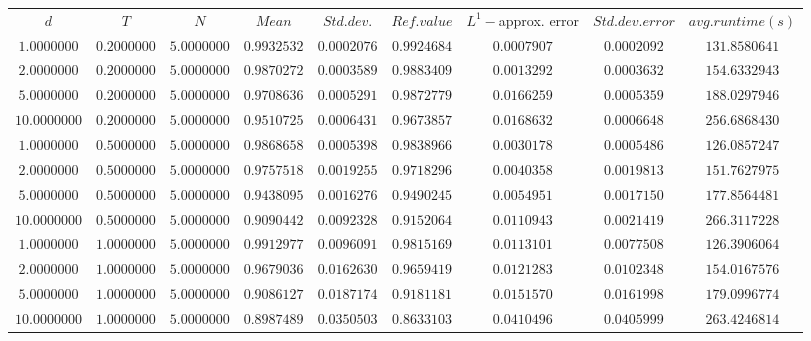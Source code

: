 \begin{tabular}{ccccccccc}
$d$ & $T$ & $N$ & $Mean$ & $Std. dev.$ & $Ref. value$ & $L^1-$approx. error & $Std. dev. error$ & $avg. runtime (s)$\\
$1.0000000$ & $0.2000000$ & $5.0000000$ & $0.9932532$ & $0.0002076$ & $0.9924684$ & $0.0007907$ & $0.0002092$ & $131.8580641$\\
$2.0000000$ & $0.2000000$ & $5.0000000$ & $0.9870272$ & $0.0003589$ & $0.9883409$ & $0.0013292$ & $0.0003632$ & $154.6332943$\\
$5.0000000$ & $0.2000000$ & $5.0000000$ & $0.9708636$ & $0.0005291$ & $0.9872779$ & $0.0166259$ & $0.0005359$ & $188.0297946$\\
$10.0000000$ & $0.2000000$ & $5.0000000$ & $0.9510725$ & $0.0006431$ & $0.9673857$ & $0.0168632$ & $0.0006648$ & $256.6868430$\\
$1.0000000$ & $0.5000000$ & $5.0000000$ & $0.9868658$ & $0.0005398$ & $0.9838966$ & $0.0030178$ & $0.0005486$ & $126.0857247$\\
$2.0000000$ & $0.5000000$ & $5.0000000$ & $0.9757518$ & $0.0019255$ & $0.9718296$ & $0.0040358$ & $0.0019813$ & $151.7627975$\\
$5.0000000$ & $0.5000000$ & $5.0000000$ & $0.9438095$ & $0.0016276$ & $0.9490245$ & $0.0054951$ & $0.0017150$ & $177.8564481$\\
$10.0000000$ & $0.5000000$ & $5.0000000$ & $0.9090442$ & $0.0092328$ & $0.9152064$ & $0.0110943$ & $0.0021419$ & $266.3117228$\\
$1.0000000$ & $1.0000000$ & $5.0000000$ & $0.9912977$ & $0.0096091$ & $0.9815169$ & $0.0113101$ & $0.0077508$ & $126.3906064$\\
$2.0000000$ & $1.0000000$ & $5.0000000$ & $0.9679036$ & $0.0162630$ & $0.9659419$ & $0.0121283$ & $0.0102348$ & $154.0167576$\\
$5.0000000$ & $1.0000000$ & $5.0000000$ & $0.9086127$ & $0.0187174$ & $0.9181181$ & $0.0151570$ & $0.0161998$ & $179.0996774$\\
$10.0000000$ & $1.0000000$ & $5.0000000$ & $0.8987489$ & $0.0350503$ & $0.8633103$ & $0.0410496$ & $0.0405999$ & $263.4246814$\\
\end{tabular}
